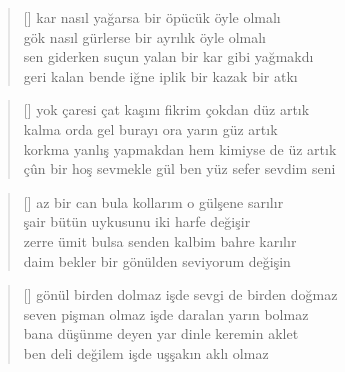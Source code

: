 \documentclass[10pt, openright, twoside]{memoir}
\theoremstyle{definition}
\begin{document}
\vspace*{\fill}
%
\newpage
{}
\vspace*{\fill}
\settowidth{\versewidth}{sen giderken suçun yalan bir kar gibi yağmakdı}
\begin{verse}[\versewidth]
  kar nasıl yağarsa bir öpücük öyle olmalı \\
  gök nasıl gürlerse bir ayrılık öyle olmalı \\
  sen giderken suçun yalan bir kar gibi yağmakdı \\
  geri kalan bende iğne iplik bir kazak bir atkı \\
\end{verse}
\vspace*{\fill}
%
\newpage
{}
\vspace*{\fill}
\settowidth{\versewidth}{çûn bir hoş sevmekle gül ben yüz sefer sevdim seni}
\begin{verse}[\versewidth]
  yok çaresi çat kaşını fikrim çokdan düz artık \\
  kalma orda gel burayı ora yarın güz artık \\
  korkma yanlış yapmakdan hem kimiyse de üz artık \\
  çûn bir hoş sevmekle gül ben yüz sefer sevdim seni \\
\end{verse}
\vspace*{\fill}
%
\newpage
{}
\vspace*{\fill}
\settowidth{\versewidth}{zerre ümit bulsa senden kalbim bahre karılır}
\begin{verse}[\versewidth]
  az bir can bula kollarım o gülşene sarılır \\
  şair bütün uykusunu iki harfe değişir \\
  zerre ümit bulsa senden kalbim bahre karılır \\
  daim bekler bir gönülden seviyorum değişin \\
\end{verse}
\vspace*{\fill}
%
\newpage
{}
\vspace*{\fill}
\settowidth{\versewidth}{gönül birden dolmaz işde sevgi de birden doğmaz}
\begin{verse}[\versewidth]
  gönül birden dolmaz işde sevgi de birden doğmaz \\
  seven pişman olmaz işde daralan yarın bolmaz \\
  bana düşünme deyen yar dinle keremin aklet \\
  ben deli değilem işde uşşakın aklı olmaz \\
\end{verse}
\end{document}
